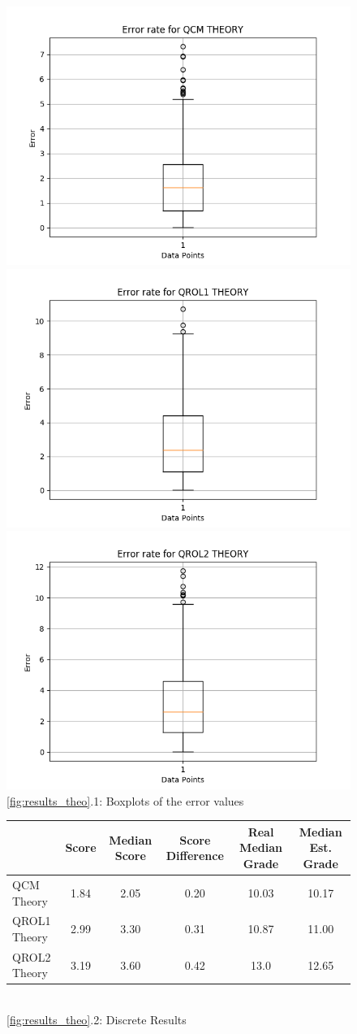 \documentclass[a4paper,11pt]{report}
\numberwithin{figure}{chapter} %
\begin{document}
      \begin{figure}[H]
      \centering
      \includegraphics[width=.30\linewidth]{plots/cv_boxplot_QCM_THEORY_2018-04-30_13_57_05.png}
      \includegraphics[width=.30\linewidth]{plots/cv_boxplot_QROL1_THEORY_2018-04-30_13_40_50.png}
      \includegraphics[width=.30\linewidth]{plots/cv_boxplot_QROL2_THEORY_2018-04-30_13_12_52.png}
      \\
      \ref{fig:results_theo}.1: Boxplots of the error values
      \\
      \vspace{0.5cm}
      \begin{tabular}{| l | c | c | c | c | c |}
      \hline
      & \tiny{Score} & \tiny{Median Score} & \tiny{Score Difference} & \tiny{Real Median Grade} & \tiny{Median Est.
      Grade}\\ \hline
      \tiny{QCM Theory} & \tiny{1.84} & \tiny{2.05} & \tiny{0.20} & \tiny{10.03} & \tiny{10.17}\\ \hline
      \tiny{QROL1 Theory} & \tiny{2.99} & \tiny{3.30} & \tiny{0.31} & \tiny{10.87} & \tiny{11.00}\\ \hline
      \tiny{QROL2 Theory} & \tiny{3.19} & \tiny{3.60} & \tiny{0.42} & \tiny{13.0} & \tiny{12.65}\\
      \hline
      \end{tabular}\\
      \vspace{0.5cm}
      \ref{fig:results_theo}.2: Discrete Results\\
      \vspace{0.3cm}

\end{figure}
\end{document}
